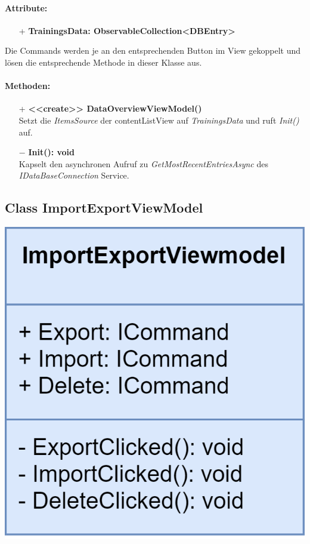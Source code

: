 \documentclass[a4paper,12pt]{article}
\begin{document}
\paragraph{Attribute:}
\begin{itemize}
	\item[+] \textbf{TrainingsData: ObservableCollection<DBEntry>}
\end{itemize}
Die Commands werden je an den entsprechenden Button im View gekoppelt und lösen die entsprechende Methode in dieser Klasse aus.
\paragraph{Methoden:}
\begin{itemize}
    \item[+] \textbf{<<create>> DataOverviewViewModel()} \\ Setzt die \textit{ItemsSource} der contentListView auf \textit{TrainingsData} und ruft \textit{Init()} auf.
    \item[$-$] \textbf{Init(): void} \\ Kapselt den asynchronen Aufruf zu \textit{GetMostRecentEntriesAsync} des \textit{IDataBaseConnection} Service.
\end{itemize} 

\begin{minipage}[t]{0.7\textwidth}

	\subsection{Class ImportExportViewModel}

\end{minipage}
\begin{minipage}[c]{0.3\textwidth}
	\includegraphics[width=\textwidth]{bilder/ViewModelKlassen/ImportExportViewModel}
\end{minipage}
\end{document}
